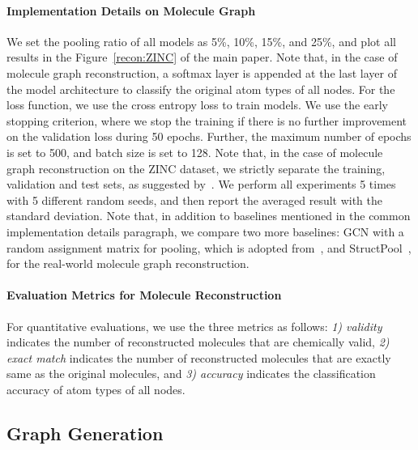 \paragraph{Implementation Details on Molecule Graph} 
We set the pooling ratio of all models as 5\%, 10\%, 15\%, and 25\%, and plot all results in the Figure~\ref{recon:ZINC} of the main paper. Note that, in the case of molecule graph reconstruction, a softmax layer is appended at the last layer of the model architecture to classify the original atom types of all nodes. For the loss function, we use the cross entropy loss to train models. We use the early stopping criterion, where we stop the training if there is no further improvement on the validation loss during 50 epochs. Further, the maximum number of epochs is set to 500, and batch size is set to 128. Note that, in the case of molecule graph reconstruction on the ZINC dataset, we strictly separate the training, validation and test sets, as suggested by~\citet{benchmarkingGNN}. We perform all experiments 5 times with 5 different random seeds, and then report the averaged result with the standard deviation. Note that, in addition to baselines mentioned in the common implementation details paragraph, we compare two more baselines: GCN with a random assignment matrix for pooling, which is adopted from~\citet{rethinking/pooling}, and StructPool~\citep{StructPool}, for the real-world molecule graph reconstruction.


\paragraph{Evaluation Metrics for Molecule Reconstruction}
For quantitative evaluations, we use the three metrics as follows: \textit{1) validity} indicates the number of reconstructed molecules that are chemically valid, \textit{2) exact match} indicates the number of reconstructed molecules that are exactly same as the original molecules, and \textit{3) accuracy} indicates the classification accuracy of atom types of all nodes.

\subsection{Graph Generation \label{appendix/generation/experimentaldetail}}

